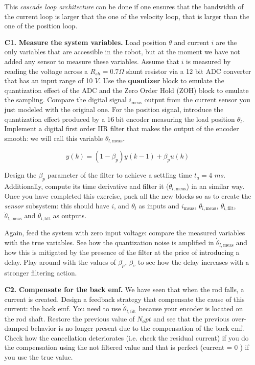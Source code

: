 \documentclass[11pt]{article}
\begin{document}
This \textit{cascade loop architecture} can be done if one ensures that 
the bandwidth of the current loop is larger that the one of the velocity loop, 
that is larger than the one of the position loop.


\par
\textbf{C1. Measure the system variables.} 
Load position $\theta$ and  current $i$ are the only variables that are accessible in the robot, 
but at the moment we have not added any sensor to  measure these variables. 
Assume that $i$ is measured by reading the voltage across a $R_{sh} = 0.7 \Omega$ shunt resistor 
via a 12 bit ADC converter that has an input range of 10 $V$. Use the \textbf{quantizer}  
block to emulate the quantization effect of the ADC and the Zero Order Hold (ZOH) block to emulate the sampling. 
Compare the digital signal $i_{\mathrm{meas}}$ output from the  
current sensor you just modeled with the original one. 
For the position signal, introduce the quantization effect produced by a $16 \ \mathrm{bit}$ 
encoder measuring the load position $\theta_l$. Implement a digital first order IIR filter that makes 
the output of the encoder smooth: we will call this variable $\theta_{l,\mathrm{meas}}$. 


\begin{equation}
y(k) = (1-\beta_p)y(k-1) + \beta_p u(k)
\end{equation}

Design the $\beta_p$ parameter of the filter to achieve a settling time $t_a = 4$ $ms$.
Additionally, compute its  time derivative and filter it ($\dot{\theta}_{l,\mathrm{meas}}$) in an similar way. 
Once you have completed this exercise, pack all the new blocks so as 
to create the \textit{sensor} subsystem: this should have $i$, 
and $\theta_l$ as inputs and $i_{\mathrm{meas}}$, 
$\theta_{l,\mathrm{meas}}$, $\theta_{l,\mathrm{filt}}$, 
$\dot{\theta}_{l,\mathrm{meas}}$ and $\dot{\theta}_{l,\mathrm{filt}}$ as outputs.

Again, feed the system with zero input voltage: compare the measured variables with the true variables.
See how the quantization noise is amplified in  $\dot{\theta}_{l,\mathrm{meas}}$ and how this is mitigated 
by the presence of the filter at the price of introducing a delay. Play around with the values of $\beta_p$, $\beta_v$ 
to see how the delay increases with a stronger filtering action. 
%
%
\par
\textbf{C2. Compensate for the back emf.} 
We have seen that when the rod falls, a current is created. 
Design a feedback strategy that compensate the cause of this current: 
the back emf. You need to use $\dot{\theta}_{l,\mathrm{filt}}$ because your encoder is located 
on the rod shaft. Restore the previous value of $N_opt$ and see that the previous over-damped behavior 
is no longer present due to the compensation of the back emf. Check how the cancellation deteriorates (i.e. check the residual current)
if you do the compensation using the not filtered value and that is perfect (current = 0 ) if you use the true value. 
\end{document}
